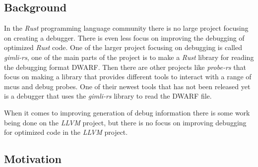 \subsection{Background}


In the \emph{Rust} programming language community there is no large project focusing on creating a debugger.
There is even less focus on improving the debugging of optimized \emph{Rust} code.
One of the larger project focusing on debugging is called \emph{gimli-rs}, one of the main parts of the project is to make a \emph{Rust} library for reading the debugging format \gls{DWARF}.
Then there are other projects like \emph{probe-rs} that focus on making a library that provides different tools to interact with a range of \glspl{mcu} and debug probes.
One of their newest tools that has not been released yet is a debugger that uses the \emph{gimli-rs} library to read the \gls{DWARF} file.


When it comes to improving generation of debug information there is some work being done on the \emph{LLVM} project, but there is no focus on improving debugging for optimized code in the \emph{LLVM} project.



\subsection{Motivation}



